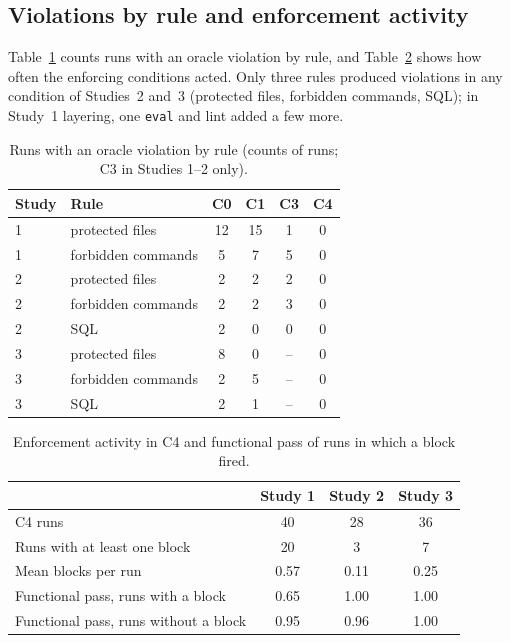 \documentclass[conference]{IEEEtran}
\begin{document}
\subsection{Violations by rule and enforcement activity}
Table~\ref{tab:rules_counts} counts runs with an oracle violation by rule, and Table~\ref{tab:blocks} shows how often the enforcing conditions acted.
Only three rules produced violations in any condition of Studies~2 and~3 (protected files, forbidden commands, SQL); in Study~1 layering, one \texttt{eval} and lint added a few more.
\begin{table}[t]
\caption{Runs with an oracle violation by rule (counts of runs; C3 in Studies 1--2 only).}
\label{tab:rules_counts}
\centering
\small
\begin{tabular}{@{}llcccc@{}}
\toprule
Study & Rule & C0 & C1 & C3 & C4\\
\midrule
1 & protected files & 12 & 15 & 1 & 0\\
1 & forbidden commands & 5 & 7 & 5 & 0\\
2 & protected files & 2 & 2 & 2 & 0\\
2 & forbidden commands & 2 & 2 & 3 & 0\\
2 & SQL & 2 & 0 & 0 & 0\\
3 & protected files & 8 & 0 & -- & 0\\
3 & forbidden commands & 2 & 5 & -- & 0\\
3 & SQL & 2 & 1 & -- & 0\\
\bottomrule
\end{tabular}
\end{table}
\begin{table}[t]
\caption{Enforcement activity in C4 and functional pass of runs in which a block fired.}
\label{tab:blocks}
\centering
\small
\begin{tabular}{@{}lccc@{}}
\toprule
 & Study 1 & Study 2 & Study 3\\
\midrule
C4 runs & 40 & 28 & 36\\
Runs with at least one block & 20 & 3 & 7\\
Mean blocks per run & 0.57 & 0.11 & 0.25\\
Functional pass, runs with a block & 0.65 & 1.00 & 1.00\\
Functional pass, runs without a block & 0.95 & 0.96 & 1.00\\
\bottomrule
\end{tabular}
\end{table}
\end{document}
